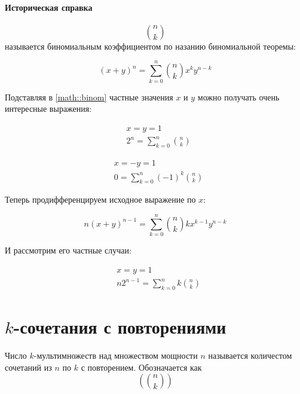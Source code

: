 \paragraph{Историческая справка}

\[\binom{n}{k}\] называется биномиальным коэффициентом по назанию биномиальной теоремы:

\begin{equation}
	\left( x + y \right) ^n = \sum_{k=0}^n \binom{n}{k}x^k y^{n-k}
	\label{math::binom}
\end{equation}

Подставляя в \ref{math::binom} частные значения $x$ и $y$ можно получать очень интересные выражения:

\begin{equation}
	\begin{split}
		& x = y = 1 \\
		& 2^n = \sum_{k=0}^n \binom{n}{k}
	\end{split}
\end{equation}

\begin{equation}
	\begin{split}
		& x = -y = 1 \\
		& 0 = \sum_{k=0}^n \left(-1\right) ^k \binom{n}{k}
	\end{split}
\end{equation}

Теперь продифференцируем исходное выражение по $x$:

\begin{equation}
	n \left( x + y \right) ^{n-1} = \sum_{k=0}^n \binom{n}{k} k x^{k-1} y^{n-k}
\end{equation}

И рассмотрим его частные случаи:

\begin{equation}
	\begin{split}
		& x = y = 1 \\
		& n 2^{n-1} = \sum_{k=0}^n k \binom{n}{k}
	\end{split}
\end{equation}

\section{$k$-сочетания с повторениями}

\begin{Def}
Число $k$-мультимножеств над множеством мощности $n$ называется количестом сочетаний из $n$ по $k$ с повторением. Обозначается как
\[
	\left( \binom{n}{k} \right)
\]
\end{Def}

